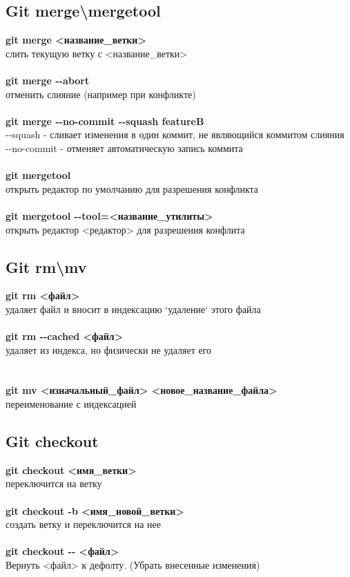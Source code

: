 \documentclass[a4paper, 12px]{article}
\begin{document}
\subsection{Git merge\textbackslash mergetool}

\textbf{git merge <название\_ветки>}\\слить текущую ветку с <название\_ветки>\\\\
\textbf{git merge -\--abort}\\отменить слияние (например при конфликте)\\\\
\textbf{git merge -\--no-commit -\--squash featureB}\\-\--squash - сливает изменения в один коммит, не являющийся коммитом слияния\\
-\--no-commit - отменяет автоматическую запись коммита\\\\
\textbf{git mergetool}\\открыть редактор по умолчанию для разрешения конфликта\\\\
\textbf{git mergetool -\--tool=<название\_утилиты>}\\открыть редактор <редактор> для разрешения конфлита

\subsection{Git rm\textbackslash mv}

\textbf{git rm <файл>}\\удаляет файл и вносит в индексацию `удаление` этого файла\\\\
\textbf{git rm -\--cached <файл>}\\удаляет из индекса, но физически не удаляет его\\\\\\
\textbf{git mv <изначальный\_файл> <новое\_название\_файла>}\\
переименование с индексацией

\subsection{Git checkout}

\textbf{git checkout <имя\_ветки>}\\переключится на ветку\\\\
\textbf{git checkout -b <имя\_новой\_ветки>}\\создать ветку и переключится на нее\\\\
\textbf{git checkout -\-- <файл>}\\Вернуть <файл> к дефолту. (Убрать внесенные изменения)
\end{document}
